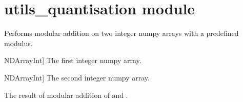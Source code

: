 \documentclass[letterpaper,10pt,english]{sphinxmanual}
\begin{document}
\sphinxstepscope


\section{utils\_quantisation module}
\label{\detokenize{utils_quantisation:module-utils_quantisation}}\label{\detokenize{utils_quantisation:utils-quantisation-module}}\label{\detokenize{utils_quantisation::doc}}

\begin{fulllineitems}
\label{\detokenize{utils_quantisation:utils_quantisation.add_mod}}
\pysigstartsignatures
{}
\pysigstopsignatures
\sphinxAtStartPar
Performs modular addition on two integer numpy arrays with a predefined modulus.
\begin{description}
\begin{description}
\sphinxlineitem{x}{[}NDArrayInt{]}
\sphinxAtStartPar
The first integer numpy array.

\sphinxlineitem{y}{[}NDArrayInt{]}
\sphinxAtStartPar
The second integer numpy array.

\end{description}

\begin{description}
\sphinxAtStartPar
The result of modular addition of  and .

\end{description}

\end{description}

\end{fulllineitems}
\end{document}

